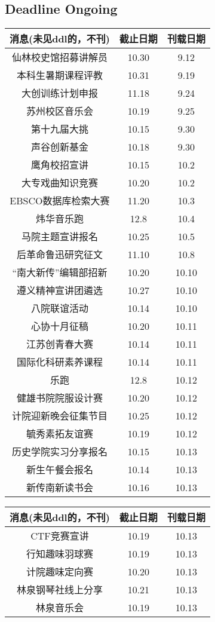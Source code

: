 \documentclass[letterpaper, 12pt]{article}
\begin{document}
\begin{multicols}{2}

\section{Deadline Ongoing}
\begin{tabular}{|c|c|c|}
    \hline
    消息(未见ddl的，不刊) & 截止日期 & 刊载日期\\
    \hline\hline
    仙林校史馆招募讲解员 & 10.30 & 9.12\\
    本科生暑期课程评教 & 10.31 & 9.19\\
    大创训练计划申报 & 11.18 & 9.24\\
    苏州校区音乐会 & 10.19 & 9.25\\
    第十九届大挑 & 10.15 & 9.30\\
    声谷创新基金 & 10.18 & 9.30\\
    鹰角校招宣讲 & 10.15 & 10.2\\
    大专戏曲知识竞赛 & 10.20 & 10.2\\
    EBSCO数据库检索大赛 & 11.20 & 10.3\\
    炜华音乐跑 & 12.8 & 10.4\\
    马院主题宣讲报名 & 10.25 & 10.5\\
    后革命鲁迅研究征文 & 11.10 & 10.8\\
    “南大新传”编辑部招新 & 10.20 & 10.10\\
    遵义精神宣讲团遴选 & 10.27 & 10.10\\
    八院联谊活动 & 10.14 & 10.10\\
    心协十月征稿 & 10.20 & 10.11\\
    江苏创青春大赛 & 10.14 & 10.11\\
    国际化科研素养课程 & 10.14 & 10.11\\
    乐跑 & 12.8 & 10.12\\
    健雄书院院服设计赛 & 10.20 & 10.12\\
    计院迎新晚会征集节目 & 10.25 & 10.12\\
    毓秀素拓友谊赛 & 10.19 & 10.12\\
    历史学院实习分享报名 & 10.15 & 10.13\\
    新生午餐会报名 & 10.14 & 10.13\\
    新传南新读书会 & 10.16 & 10.13\\

    \hline
\end{tabular}
\begin{tabular}{|c|c|c|}
    \hline
    消息(未见ddl的，不刊) & 截止日期 & 刊载日期\\
    \hline\hline
    CTF竞赛宣讲 & 10.19 & 10.13\\
    行知趣味羽球赛 & 10.19 & 10.13\\
    计院趣味定向赛 & 10.20 & 10.13\\
    林泉钢琴社线上分享 & 10.21 & 10.13\\
    林泉音乐会 & 10.19 & 10.13\\
    \hline
\end{tabular}


\end{multicols}
\end{document}
